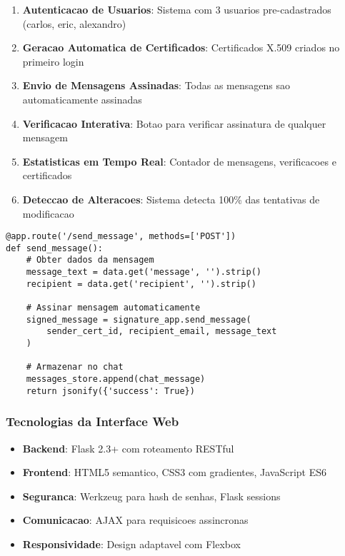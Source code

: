 \documentclass[12pt,a4paper,oneside]{article}
\begin{document}
\begin{enumerate}
    \item \textbf{Autenticacao de Usuarios}: Sistema com 3 usuarios pre-cadastrados (carlos, eric, alexandro)
    \item \textbf{Geracao Automatica de Certificados}: Certificados X.509 criados no primeiro login
    \item \textbf{Envio de Mensagens Assinadas}: Todas as mensagens sao automaticamente assinadas
    \item \textbf{Verificacao Interativa}: Botao para verificar assinatura de qualquer mensagem
    \item \textbf{Estatisticas em Tempo Real}: Contador de mensagens, verificacoes e certificados
    \item \textbf{Deteccao de Alteracoes}: Sistema detecta 100\% das tentativas de modificacao
\end{enumerate}

\begin{lstlisting}[caption=Estrutura da aplicacao Flask]
@app.route('/send_message', methods=['POST'])
def send_message():
    # Obter dados da mensagem
    message_text = data.get('message', '').strip()
    recipient = data.get('recipient', '').strip()
    
    # Assinar mensagem automaticamente
    signed_message = signature_app.send_message(
        sender_cert_id, recipient_email, message_text
    )
    
    # Armazenar no chat
    messages_store.append(chat_message)
    return jsonify({'success': True})
\end{lstlisting}

\subsubsection{Tecnologias da Interface Web}

\begin{itemize}
    \item \textbf{Backend}: Flask 2.3+ com roteamento RESTful
    \item \textbf{Frontend}: HTML5 semantico, CSS3 com gradientes, JavaScript ES6
    \item \textbf{Seguranca}: Werkzeug para hash de senhas, Flask sessions
    \item \textbf{Comunicacao}: AJAX para requisicoes assincronas
    \item \textbf{Responsividade}: Design adaptavel com Flexbox
\end{itemize}
\end{document}
